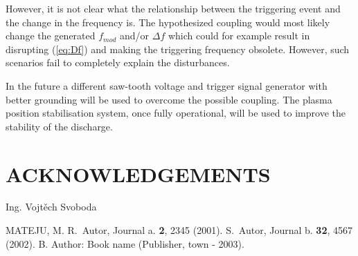 \documentclass[twoside]{articlek}
\begin{document}
However, it is not clear what the relationship between the triggering event and the change in the frequency is. The hypothesized coupling would most likely change the generated $f_{mod}$ and/or $\Delta f$ which could for example result in disrupting (\ref{eq:Df}) and making the triggering frequency obsolete. However, such scenarios fail to completely explain the disturbances.

In the future a different saw-tooth voltage and trigger signal generator with better grounding will be used to overcome the possible coupling. The plasma position stabilisation system, once fully operational, will be used to improve the stability of the discharge.
\section{ACKNOWLEDGEMENTS}

Ing. Vojtěch Svoboda %


\begin{thebibliography}{99}

\leftskip=-5pt \vspace{-0.3truecm}
 MATEJU, M.
 R.~Autor, Journal a. {\bf 2}, 2345 (2001).
 S.~Autor, Journal b. {\bf 32}, 4567 (2002).
 B. Author: Book name (Publisher, town - 2003).
\end{thebibliography}
\end{document}
